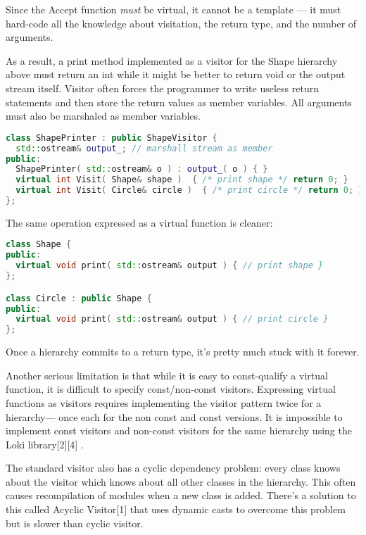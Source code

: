 \documentclass{book}
\begin{document}
Since the Accept function \textit{must} be virtual, it cannot be a template — it must hard-code all the knowledge about visitation, the return type, and the number of arguments.

As a result, a print method implemented as a visitor for the Shape hierarchy above must return an int while it might be better to return void or the output stream itself.
Visitor often forces the programmer to write useless return statements and then store the return values as member variables. All arguments must also be marshaled as member variables.

\begin{lstlisting}[caption={visitor pattern sample code 6-2},language=C++]
class ShapePrinter : public ShapeVisitor {
  std::ostream& output_; // marshall stream as member
public:
  ShapePrinter( std::ostream& o ) : output_( o ) { }
  virtual int Visit( Shape& shape )  { /* print shape */ return 0; }
  virtual int Visit( Circle& circle )  { /* print circle */ return 0; }
};
\end{lstlisting}

The same operation expressed as a virtual function is cleaner:

\begin{lstlisting}[caption={visitor pattern sample code 6-3},language=C++]
class Shape {
public:
  virtual void print( std::ostream& output ) { // print shape }
};

class Circle : public Shape {
public:
  virtual void print( std::ostream& output ) { // print circle }
};
\end{lstlisting}

Once a hierarchy commits to a return type, it's pretty much stuck with it forever.

Another serious limitation is that while it is easy to const-qualify a virtual function, it is difficult to specify const/non-const visitors.
Expressing virtual functions as visitors requires implementing the visitor pattern twice for a hierarchy— once each for the non const and const versions.
It is impossible to implement const visitors and non-const visitors for the same hierarchy using the Loki library[2][4] .

The standard visitor also has a cyclic dependency problem: every class knows about the visitor which knows about all other classes in the hierarchy.
This often causes recompilation of modules when a new class is added.
There's a solution to this called Acyclic Visitor[1] that uses dynamic casts to overcome this problem but is slower than cyclic visitor.
\end{document}
